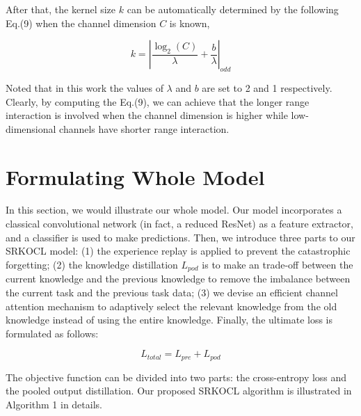 \documentclass[review]{elsarticle}
\begin{document}
After that, the kernel size $k$ can be automatically determined by the following Eq.(9) when the channel dimension $C$ is known, 

\begin{equation}
k = {\left| {\frac{{{{\log }_2}\left( C \right)}}{\lambda } + \frac{b}{\lambda }} \right|_{odd}}
\end{equation}

Noted that in this work the values of $\lambda $ and $b$ are set to 2 and 1 respectively. Clearly, by computing the Eq.(9), we can achieve that the longer range interaction is involved when the channel dimension is higher while low-dimensional channels have shorter range interaction.

\section{Formulating Whole Model}

In this section, we would illustrate our whole model. Our model incorporates a classical convolutional network (in fact, a reduced ResNet) as a feature extractor, and a classifier is used to make predictions. Then, we introduce three parts to our SRKOCL model: (1) the experience replay is applied to prevent the catastrophic forgetting; (2) the knowledge distillation ${L_{pod}}$ is to make an trade-off between the current knowledge and the previous knowledge to remove the imbalance between the current task and the previous task data; (3) we devise an efficient channel attention mechanism to adaptively select the relevant knowledge from the old knowledge instead of using the entire knowledge. Finally, the ultimate loss is formulated as follows:

\begin{equation}
{L_{total}} = {L_{pre}} + {L_{pod}}
\end{equation}

The objective function can be divided into two parts: the cross-entropy loss and the pooled output distillation. Our proposed SRKOCL algorithm is illustrated in Algorithm 1 in details.
\end{document}
